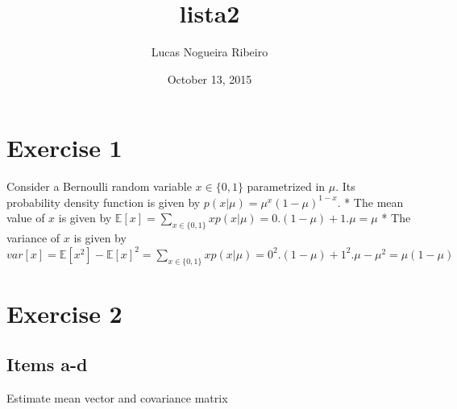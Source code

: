\documentclass[letterpaper,10pt,english]{/usr/share/sphinx/texinputs/sphinxhowto}
\title{lista2}
\date{October 13, 2015}
\author{Lucas Nogueira Ribeiro}
\begin{document}
        
            \maketitle
        

        


        
        \section{Exercise 1}\label{exercise-1}

Consider a Bernoulli random variable $x \in \{0,1\}$ parametrized in
$\mu$. Its probability density function is given by
$p(x|\mu) = \mu^x(1-\mu)^{1-x}$. * The mean value of $x$ is given by
$\mathbb{E}[x] = \sum_{x\in\{0,1\}} xp(x|\mu) = 0.(1-\mu) + 1.\mu = \mu$
* The variance of $x$ is given by
$var[x] = \mathbb{E}[x^2] - \mathbb{E}[x]^2 = \sum_{x\in\{0,1\}} xp(x|\mu) = 0^2.(1-\mu) + 1^2.\mu - \mu^2 = \mu(1-\mu)$\section{Exercise 2}\label{exercise-2}

\subsection{Items a-d}\label{items-a-d}Estimate mean vector and covariance matrix

\end{document}
